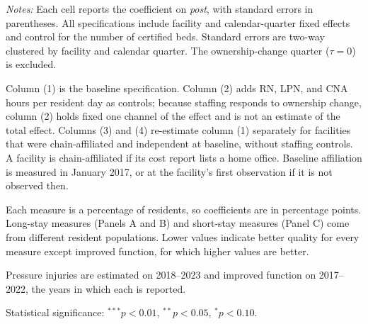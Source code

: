 \documentclass[11pt]{article}
\begin{document}
\begin{table}[!ht]
\begin{threeparttable}
\begin{tablenotes}[flushleft]
\footnotesize
\item \textit{Notes:} Each cell reports the coefficient on \textit{post}, with standard errors in parentheses. All specifications include facility and calendar-quarter fixed effects and control for the number of certified beds. Standard errors are two-way clustered by facility and calendar quarter. The ownership-change quarter ($\tau = 0$) is excluded.
\item Column (1) is the baseline specification. Column (2) adds RN, LPN, and CNA hours per resident day as controls; because staffing responds to ownership change, column (2) holds fixed one channel of the effect and is not an estimate of the total effect. Columns (3) and (4) re-estimate column (1) separately for facilities that were chain-affiliated and independent at baseline, without staffing controls. A facility is chain-affiliated if its cost report lists a home office. Baseline affiliation is measured in January 2017, or at the facility's first observation if it is not observed then.
\item Each measure is a percentage of residents, so coefficients are in percentage points. Long-stay measures (Panels A and B) and short-stay measures (Panel C) come from different resident populations. Lower values indicate better quality for every measure except improved function, for which higher values are better.
\item Pressure injuries are estimated on 2018--2023 and improved function on 2017--2022, the years in which each is reported.
\item Statistical significance: $^{***}p<0.01$, $^{**}p<0.05$, $^{*}p<0.10$.
\end{tablenotes}

\end{threeparttable}
\end{table}
\clearpage
\end{document}
